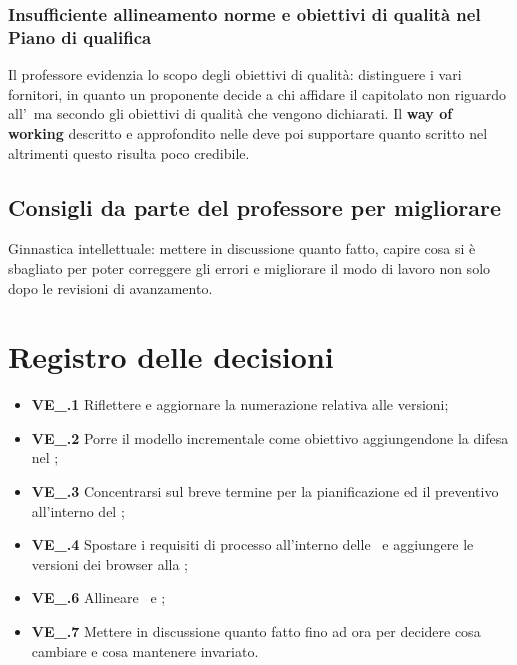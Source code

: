 \subsubsection{Insufficiente allineamento norme e obiettivi di qualità nel Piano di qualifica}
Il professore evidenzia lo scopo degli obiettivi di qualità: distinguere i vari fornitori, in quanto un proponente decide a chi affidare il capitolato non riguardo all'\AdR\, ma secondo gli obiettivi di qualità che vengono dichiarati. Il \textbf{way of working} descritto e approfondito nelle \NdP{} deve poi supportare quanto scritto nel \PdQ\, altrimenti questo risulta poco credibile.
\subsection{Consigli da parte del professore per migliorare}
Ginnastica intellettuale: mettere in discussione quanto fatto, capire cosa si è sbagliato per poter correggere gli errori e migliorare il modo di lavoro non solo dopo le revisioni di avanzamento.

\section{Registro delle decisioni}
\begin{itemize}
	\item \textbf{VE\_\Data.1} Riflettere e aggiornare la numerazione relativa alle versioni;
	\item \textbf{VE\_\Data.2} Porre il modello incrementale come obiettivo aggiungendone la difesa nel \PdP{};
	\item \textbf{VE\_\Data.3} Concentrarsi sul breve termine per la pianificazione ed il preventivo all'interno del \PdP{};
	\item \textbf{VE\_\Data.4} Spostare i requisiti di processo all'interno delle \NdP\ e aggiungere le versioni dei browser alla \AdR{};
	\item \textbf{VE\_\Data.6} Allineare \NdP\ e \PdQ{};
	\item \textbf{VE\_\Data.7} Mettere in discussione quanto fatto fino ad ora per decidere cosa cambiare e cosa mantenere invariato.
\end{itemize}